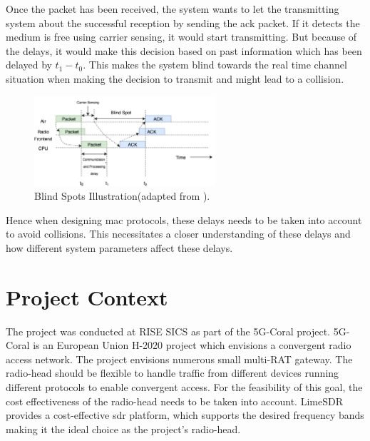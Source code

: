 Once the packet has been received, the system wants to let the transmitting system about the successful reception by sending the \ac{ack} packet. If it detects the medium is free using carrier sensing, it would start transmitting.
But because of the delays, it would make this decision based on past information which has been delayed by $t_1 - t_0$.
This makes the system blind towards the real time channel situation when making the decision to transmit and might lead to a collision. \\ 

\begin{figure}[!h]
\centering
\includegraphics[width=0.6\textwidth]{Figure/BlindSpots.png}
\caption{Blind Spots Illustration(adapted from \cite{schmid_experimental_2007}).}
\label{blind_spots}
\end{figure}

Hence when designing \ac{mac} protocols, these delays needs to be taken into account to avoid collisions.
This necessitates a closer understanding of these delays and how different system parameters affect these delays.



\section{Project Context}

The project was conducted at RISE SICS as part of the 5G-Coral project.
5G-Coral is an European Union H-2020 project which envisions a convergent radio access network.
The project envisions numerous small multi-\ac{RAT} gateway.
The radio-head should be flexible to handle traffic from different devices running different protocols to enable convergent access.
For the feasibility of this goal, the cost effectiveness of the radio-head needs to be taken into account.
LimeSDR \cite{noauthor_limesdr_nodate} provides a cost-effective \ac{sdr} platform, which supports the desired frequency bands making it the ideal choice as the project's radio-head.\\

